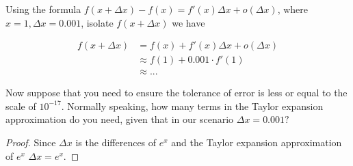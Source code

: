 \documentclass{homework}
\newcommand{\?}{\stackrel{?}{=}}
\theoremstyle{definition}
\begin{document}
Using the formula $f(x+\Delta x)-f(x)=f'(x)\Delta x+o(\Delta x)$, where $x=1, \Delta x=0.001$, isolate $f(x+\Delta x)$ we have

\begin{align*}
    f(x+\Delta x) &= f(x) + f'(x)\Delta x + o(\Delta x)\\
    &\approx f(1) + 0.001\cdot f'(1)\\
    &\approx ...
\end{align*}

\question[2] Now suppose that you need to ensure the tolerance of error is less or equal to the scale of $10^{-17}$. Normally speaking, how many terms in the Taylor expansion approximation do you need, given that in our scenario $\Delta x=0.001?$

\begin{proof}
    Since $\Delta x$ is the differences of $e^x$ and the Taylor expansion approximation of $e^x$ $\Delta x=e^x$.
\end{proof}
\end{document}
